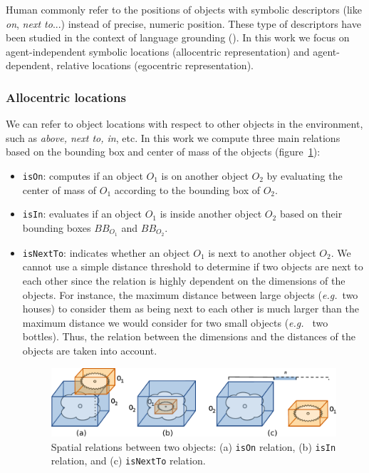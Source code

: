 \documentclass{svmult}
\newcommand{\concept}[1]{{\footnotesize \texttt{#1}}}
\newcommand{\eg}{{\textit{e.g.~}}}
\begin{document}
Human commonly refer to the positions of objects with symbolic descriptors
(like \emph{on}, \emph{next to}...) instead of precise, numeric position. These
type of descriptors have been studied in the context of language grounding
(\cite{O'Keefe1999,Matuszek2010,Regier2001,Kelleher2006,Blisard2005}). In this
work we focus on agent-independent symbolic locations (allocentric
representation)  and agent-dependent, relative locations (egocentric
representation).

\subsubsection{Allocentric locations}

We can refer to object locations with respect to other objects in the
environment, such as \emph{above, next to, in}, etc. In this work we compute
three main relations based on the bounding box and center of mass of the
objects (figure~\ref{fig|sprelations}): 

\begin{itemize}
	\item \concept{isOn}: computes if an object $O_1$ is on another object $O_2$ by
	evaluating the center of mass of $O_1$ according to the bounding box of $O_2$.

	\item \concept{isIn}: evaluates if an object $O_1$ is inside another object
	$O_2$ based on their bounding boxes $BB_{O_1}$ and $BB_{O_2}$.

	\item \concept{isNextTo}: indicates whether an object $O_1$ is next to another
	object $O_2$. We cannot use a simple distance threshold to determine if two
	objects are next to each other since the relation is highly dependent on the
	dimensions of the objects. For instance, the maximum distance between large
	objects (\eg two houses) to consider them as being next to each other is much
	larger than the maximum distance we would consider for two small objects (\eg
	two bottles). Thus, the relation between the dimensions and the distances of
	the objects are taken into account.  

\begin{figure} 
	\centering
	\includegraphics[width=0.95\columnwidth]{figs/spatial_relation.pdf}
	\caption{Spatial relations between two objects: (a) \concept{isOn} relation, 
	(b) \concept{isIn} relation, and (c) \concept{isNextTo} relation.} 
	\label{fig|sprelations} 
\end{figure}

\end{itemize} 
\end{document}
